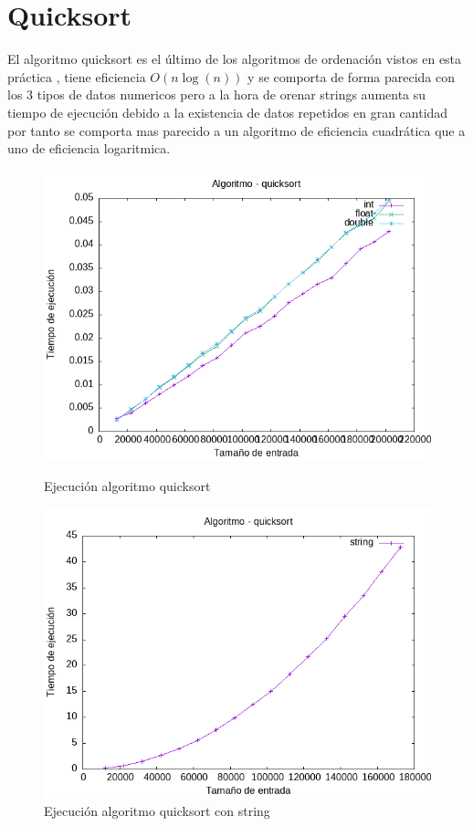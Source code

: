 \documentclass[11pt,openany]{book}
\begin{document}
\section*{Quicksort}
El algoritmo quicksort es el último de los algoritmos de ordenación vistos en esta práctica , tiene eficiencia $O(n\log(n))$ y se comporta de 
forma parecida con los 3 tipos de datos numericos pero  a la hora de orenar strings aumenta su tiempo de ejecución debido a la existencia de datos repetidos 
en gran cantidad por tanto se comporta mas parecido a un algoritmo de eficiencia cuadrática que a uno de eficiencia logaritmica.
\begin{figure}[H]
    \begin{minipage}{0.5\textwidth}
        \centering
        \includegraphics[width=\linewidth]{assets/Img/quicksort.png}
        \caption{Ejecución algoritmo quicksort}
        \label{fig:quicksort}
    \end{minipage}%
    \begin{minipage}{0.5\textwidth}
        \centering
        \includegraphics[width=\linewidth]{assets/Img/quicksortstring.png}
        \caption{Ejecución algoritmo quicksort con string}
        \label{fig:quicksortstring}
    \end{minipage}
\end{figure}
\end{document}
